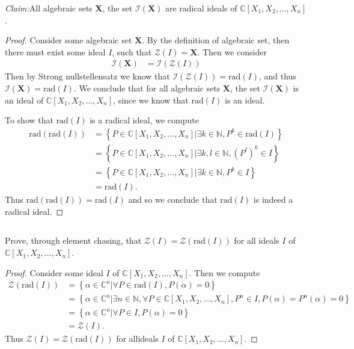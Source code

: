 \documentclass[10pt]{amsart}
\newcommand{\N}{\mathbb{N}}
\newcommand{\C}{\mathbb{C}}
\newcommand{\rad}[1]{\text{rad}\left(#1\right)}
\newenvironment{claim}[1]{\par\noindent\textit{Claim:}\space#1}{}
\begin{document}
\begin{claim}
  All algebraic sets $\mathbf{X}$, the set $\mathscr{I}(\mathbf{X})$ are
  radical ideals of $\C[X_1,X_2,\ldots,X_n]$.
\end{claim}
\begin{proof}
  Consider some algebraic set $\mathbf{X}$. By the definition of algebraic set,
  then there must exist some ideal $I$, such that $\mathscr{Z}(I)=\mathbf{X}$.
  Then we consider
  \begin{align*}
    \mathscr{I}(\mathbf{X})&=\mathscr{I}(\mathscr{Z}(I))
  \end{align*}
  Then by Strong nullstellensatz we know that
  $\mathscr{I}(\mathscr{Z}(I))=\rad{I}$, and thus
  $\mathscr{I}(\mathbf{X})=\rad{I}$. We conclude that for all algebraic sets
  $\mathbf{X}$, the set $\mathscr{I}(\mathbf{X})$ is an ideal of
  $\C[X_1,X_2,\ldots,X_n]$, since we know that $\rad{I}$ is an ideal.

  To show that $\rad{I}$ is a radical ideal, we compute
  \begin{align*}
    \rad{\rad{I}}&=\left\{P\in\C[X_1,X_2,\ldots,X_n]\vert\exists
      k\in\N,P^k\in\rad{I}\right\}\\
    &=\left\{P\in\C[X_1,X_2,\ldots,X_n]\vert\exists
      k,l\in\N,{\left(P^l\right)}^k\in I\right\}\\
    &=\left\{P\in\C[X_1,X_2,\ldots,X_n]\vert\exists
      k\in\N,P^k\in I\right\}\\
    &=\rad{I}.
  \end{align*}
  Thus $\rad{\rad{I}}=\rad{I}$ and so we conclude that $\rad{I}$ is indeed a
  radical ideal.
\end{proof}

\subsection{}%
\label{sub:4b}

Prove, through element chasing, that $\mathscr{Z}(I)=\mathscr{Z}(\rad{I})$ for
all ideals $I$ of $\C[X_1,X_2,\ldots,X_n]$.

\begin{proof}
  Consider some ideal $I$ of $\C[X_1,X_2,\ldots,X_n]$. Then we compute
  \begin{align*}
    \mathscr{Z}(\rad{I})&=\left\{\alpha\in\C^n\vert\forall
      P\in\rad{I},P(\alpha)=0\right\}\\
    &=\left\{\alpha\in\C^n\vert\exists n\in\N,\forall
      P\in\C[X_1,X_2,\ldots,X_n],P^n\in I, P(\alpha)=P^n(\alpha)=0\right\}\\
    &=\left\{\alpha\in\C^n\vert\forall P\in I,P(\alpha)=0\right\}\\
    &=\mathscr{Z}(I).
  \end{align*}
  Thus $\mathscr{Z}(I)=\mathscr{Z}(\rad{I})$ for allideals $I$ of
  $\C[X_1,X_2,\ldots,X_n]$.
\end{proof}
\end{document}
